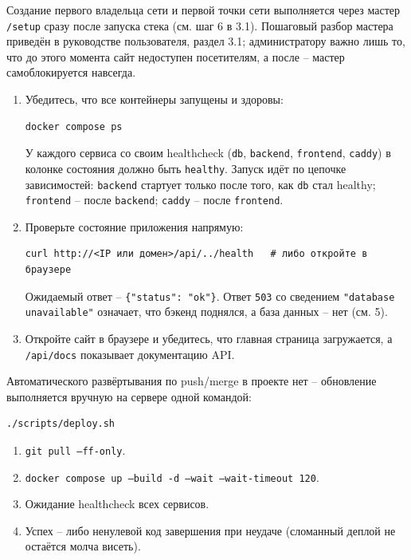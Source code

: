 
Создание первого владельца сети и первой точки сети выполняется через
мастер \texttt{/setup} сразу после запуска стека (см. шаг 6 в 3.1).
Пошаговый разбор мастера приведён в руководстве пользователя,
раздел 3.1; администратору важно лишь то, что до этого момента сайт
недоступен посетителям, а после -- мастер самоблокируется навсегда.


\begin{enumerate}
  \item Убедитесь, что все контейнеры запущены и здоровы:
\begin{verbatim}
docker compose ps
\end{verbatim}
        У каждого сервиса со своим healthcheck (\texttt{db},
        \texttt{backend}, \texttt{frontend}, \texttt{caddy}) в колонке
        состояния должно быть \texttt{healthy}. Запуск идёт по цепочке
        зависимостей: \texttt{backend} стартует только после того, как
        \texttt{db} стал healthy; \texttt{frontend} -- после
        \texttt{backend}; \texttt{caddy} -- после \texttt{frontend}.
  \item Проверьте состояние приложения напрямую:
\begin{verbatim}
curl http://<IP или домен>/api/../health   # либо откройте в браузере
\end{verbatim}
        Ожидаемый ответ -- \texttt{\{"status": "ok"\}}. Ответ
        \texttt{503} со сведением \texttt{"database unavailable"}
        означает, что бэкенд поднялся, а база данных -- нет (см. 5).
  \item Откройте сайт в браузере и убедитесь, что главная страница
        загружается, а \texttt{/api/docs} показывает документацию API.
\end{enumerate}



Автоматического развёртывания по push/merge в проекте нет -- обновление
выполняется вручную на сервере одной командой:
\begin{verbatim}
./scripts/deploy.sh
\end{verbatim}

\begin{enumerate}
  \item \texttt{git pull --ff-only}.
  \item \texttt{docker compose up --build -d --wait --wait-timeout 120}.
  \item Ожидание healthcheck всех сервисов.
  \item Успех -- либо ненулевой код завершения при неудаче (сломанный
        деплой не остаётся молча висеть).
\end{enumerate}

